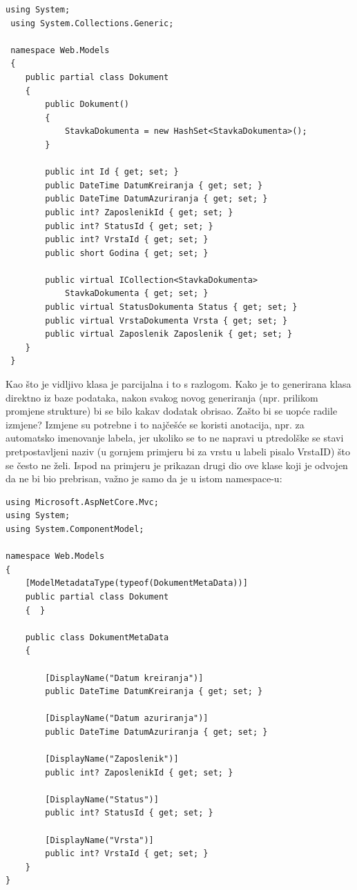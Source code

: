 \documentclass[a4paper,12pt]{foi}
\begin{document}
\begin{lstlisting}[language={[Sharp]C}]
 using System;
 using System.Collections.Generic;

 namespace Web.Models
 {
    public partial class Dokument
    {
        public Dokument()
        {
            StavkaDokumenta = new HashSet<StavkaDokumenta>();
        }

        public int Id { get; set; }
        public DateTime DatumKreiranja { get; set; }
        public DateTime DatumAzuriranja { get; set; }
        public int? ZaposlenikId { get; set; }
        public int? StatusId { get; set; }
        public int? VrstaId { get; set; }
        public short Godina { get; set; }

        public virtual ICollection<StavkaDokumenta> 
        	StavkaDokumenta { get; set; }
        public virtual StatusDokumenta Status { get; set; }
        public virtual VrstaDokumenta Vrsta { get; set; }
        public virtual Zaposlenik Zaposlenik { get; set; }
    }
 }

\end{lstlisting}

Kao što je vidljivo klasa je parcijalna i to s razlogom. Kako je to generirana klasa direktno iz baze podataka, nakon svakog novog generiranja (npr. prilikom promjene strukture) bi se bilo kakav dodatak obrisao. Zašto bi se uopće radile izmjene? Izmjene su potrebne i to najčešće se koristi anotacija, npr. za automatsko imenovanje labela, jer ukoliko se to ne napravi u ptredolške se stavi pretpostavljeni naziv (u gornjem primjeru bi za vrstu u labeli pisalo VrstaID) što se često ne želi. Ispod na primjeru je prikazan drugi dio ove klase koji je odvojen da ne bi bio prebrisan, važno je samo da je u istom namespace-u:

\begin{lstlisting}[language={[Sharp]C}]
using Microsoft.AspNetCore.Mvc;
using System;
using System.ComponentModel;

namespace Web.Models
{
    [ModelMetadataType(typeof(DokumentMetaData))]
    public partial class Dokument
    {  }

    public class DokumentMetaData
    {

        [DisplayName("Datum kreiranja")]
        public DateTime DatumKreiranja { get; set; }

        [DisplayName("Datum azuriranja")]
        public DateTime DatumAzuriranja { get; set; }

        [DisplayName("Zaposlenik")]
        public int? ZaposlenikId { get; set; }

        [DisplayName("Status")]
        public int? StatusId { get; set; }

        [DisplayName("Vrsta")]
        public int? VrstaId { get; set; }
    }
}
\end{lstlisting}
\end{document}
